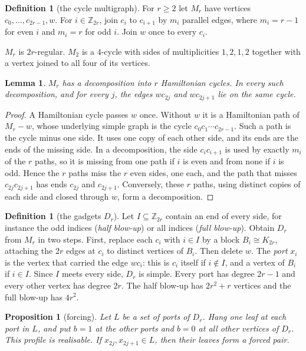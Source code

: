 \documentclass[11pt]{amsart}
\newtheorem{lemma}[theorem]{Lemma}
\newtheorem{proposition}[theorem]{Proposition}
\theoremstyle{definition}
\newtheorem{definition}[theorem]{Definition}
\begin{document}
\begin{definition}[the cycle multigraph]
For $r\ge2$ let $M_r$ have vertices $c_0,\dots,c_{2r-1},w$. For $i\in\mathbb Z_{2r}$, join $c_i$ to
$c_{i+1}$ by $m_i$ parallel edges, where $m_i=r-1$ for even $i$ and $m_i=r$ for odd $i$. Join $w$ once
to every $c_i$.
\end{definition}

$M_r$ is $2r$-regular. $M_2$ is a $4$-cycle with sides of multiplicities $1,2,1,2$ together with a
vertex joined to all four of its vertices.

\begin{lemma}\label{lem:Mr}
$M_r$ has a decomposition into $r$ Hamiltonian cycles. In every such decomposition, and for every $j$,
the edges $wc_{2j}$ and $wc_{2j+1}$ lie on the same cycle.
\end{lemma}

\begin{proof}
A Hamiltonian cycle passes $w$ once. Without $w$ it is a Hamiltonian path of $M_r-w$, whose
underlying simple graph is the cycle $c_0c_1\cdots c_{2r-1}$. Such a path is the cycle minus one side.
It uses one copy of each other side, and its ends are the ends of the missing side. In a decomposition,
the side $c_ic_{i+1}$ is used by exactly $m_i$ of the $r$ paths, so it is missing from one path if $i$
is even and from none if $i$ is odd. Hence the $r$ paths miss the $r$ even sides, one each, and the
path that misses $c_{2j}c_{2j+1}$ has ends $c_{2j}$ and $c_{2j+1}$. Conversely, these $r$ paths, using
distinct copies of each side and closed through $w$, form a decomposition.
\end{proof}

\begin{definition}[the gadgets $D_r$]\label{def:Dr}
Let $I\subseteq\mathbb Z_{2r}$ contain an end of every side, for instance the odd indices
(\emph{half blow-up}) or all indices (\emph{full blow-up}). Obtain $D_r$ from $M_r$ in two steps. First,
replace each $c_i$ with $i\in I$ by a block $B_i\cong K_{2r}$, attaching the $2r$ edges at $c_i$ to
distinct vertices of $B_i$. Then delete $w$. The \emph{port} $x_i$ is the vertex that carried the edge
$wc_i$: this is $c_i$ itself if $i\notin I$, and a vertex of $B_i$ if $i\in I$. Since $I$ meets every
side, $D_r$ is simple. Every port has degree $2r-1$ and every other vertex has degree $2r$. The half
blow-up has $2r^2+r$ vertices and the full blow-up has $4r^2$.
\end{definition}

\begin{proposition}[forcing]\label{prop:forcing}
Let $L$ be a set of ports of $D_r$. Hang one leaf at each port in $L$, and put $b=1$ at the other ports
and $b=0$ at all other vertices of $D_r$. This profile is realisable. If $x_{2j},x_{2j+1}\in L$, then
their leaves form a forced pair.
\end{proposition}
\end{document}
